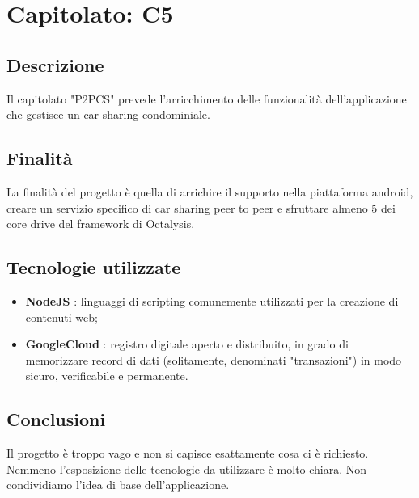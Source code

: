 \section{Capitolato: C5}
	\subsection{Descrizione}
		Il capitolato "P2PCS" prevede l'arricchimento delle funzionalità dell'applicazione che gestisce un car sharing condominiale.
	\subsection{Finalità}
		La finalità del progetto è quella di arrichire il supporto nella piattaforma android, creare un servizio specifico di car sharing peer to peer e sfruttare almeno 5 dei core drive del framework di Octalysis.
	\subsection{Tecnologie utilizzate}
		\begin{itemize}
			\item \textbf{NodeJS} : linguaggi di scripting comunemente utilizzati per la creazione di contenuti web;
			\item \textbf{GoogleCloud} : registro digitale aperto e distribuito, in grado di memorizzare record di dati (solitamente, denominati "transazioni") in modo sicuro, verificabile e permanente.
		\end{itemize}
	\subsection{Conclusioni}
		Il progetto è troppo vago e non si capisce esattamente cosa ci è richiesto. Nemmeno l'esposizione delle tecnologie da utilizzare è molto chiara.
		Non condividiamo l'idea di base dell'applicazione. 